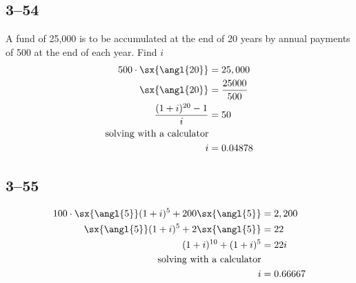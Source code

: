 \documentclass[a4paper, 12pt, reqno]{amsart}
\numberwithin{equation}{section}
\begin{document}
\subsection*{3--54}

A fund of 25,000 is to be accumulated at the end of 20 years by annual payments
of 500 at the end of each year. Find $i$
\begin{equation}\nonumber
    \begin{aligned}
        500 \cdot \sx{\angl{20}} &= 25,000    \\
        \sx{\angl{20}} &= \frac{25000}{500}    \\
        \frac{(1+i)^{20}-1}{i} &= 50    \\
        \text{solving with a calculator}    \\
        i &= 0.04878
    \end{aligned}
\end{equation}

\subsection*{3--55}

\begin{equation}\nonumber
    \begin{aligned}
        100 \cdot \sx{\angl{5}}(1+i)^5 + 200 \sx{\angl{5}} &= 2,200    \\
        \sx{\angl{5}}(1+i)^5 + 2 \sx{\angl{5}} &= 22    \\
        (1+i)^{10} + (1+i)^5 &= 22i \\
        \text{solving with a calculator}    \\
        i &= 0.66667
    \end{aligned}
\end{equation}
\end{document}
